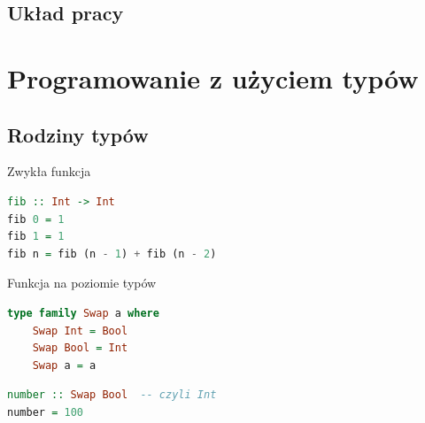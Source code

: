 \documentclass[polish]{beamer}
\makeatletter
\newcommand*{\currentname}{\@currentlabelname}
\makeatother
\begin{document}
\subsection{Układ pracy} %
\begin{tframe}{\currentname} %
    \begin{multicols}{2}
        \small
        \tableofcontents
    \end{multicols}
\end{tframe}


\section{Programowanie z użyciem typów} %
\subsection{Rodziny typów} %
\begin{frame}[t,fragile]{\currentname}
\begin{block}{Zwykła funkcja}
\begin{lstlisting}[language=Haskell,basicstyle=\tiny\ttfamily,keywordstyle=\color{alerted text.fg}]
fib :: Int -> Int
fib 0 = 1
fib 1 = 1
fib n = fib (n - 1) + fib (n - 2)
\end{lstlisting}
\end{block}
\begin{block}{Funkcja na poziomie typów}
\begin{lstlisting}[language=Haskell,basicstyle=\tiny\ttfamily,keywordstyle=\color{alerted text.fg}]
type family Swap a where
    Swap Int = Bool
    Swap Bool = Int
    Swap a = a
\end{lstlisting}
\begin{lstlisting}[language=Haskell,basicstyle=\tiny\ttfamily,keywordstyle=\color{alerted text.fg}]
number :: Swap Bool  -- czyli Int
number = 100
\end{lstlisting}
\end{block}
\end{frame}
\end{document}
